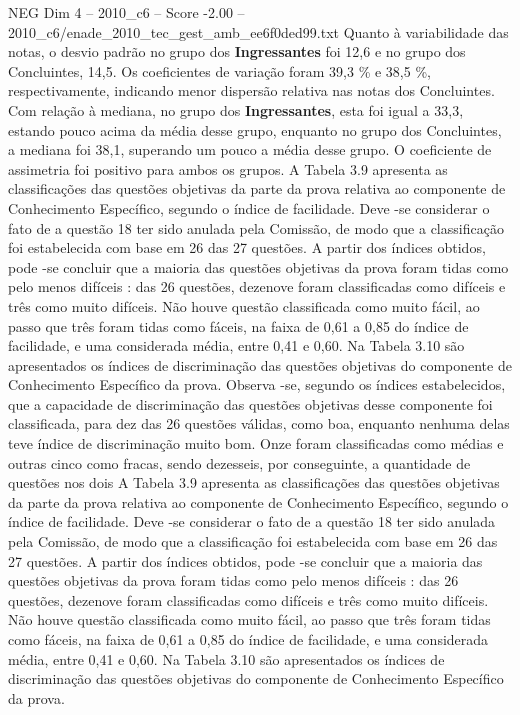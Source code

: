 \begin{textsample}{NEG Dim 4 – 2010\_c6 – Score -2.00 – 2010\_c6/enade\_2010\_tec\_gest\_amb\_ee6f0ded99.txt}
Quanto à variabilidade das notas, o desvio padrão no grupo dos \textbf{Ingressantes} foi 12,6 e no grupo dos Concluintes, 14,5.
Os coeficientes de variação foram 39,3 \% e 38,5 \%, respectivamente, indicando menor dispersão relativa nas notas dos Concluintes.
Com relação à mediana, no grupo dos \textbf{Ingressantes}, esta foi igual a 33,3, estando pouco acima da média desse grupo, enquanto no grupo dos Concluintes, a mediana foi 38,1, superando um pouco a média desse grupo.
O coeficiente de assimetria foi positivo para ambos os grupos.
A Tabela 3.9 apresenta as classificações das questões objetivas da parte da prova relativa ao componente de Conhecimento Específico, segundo o índice de facilidade.
Deve -se considerar o fato de a questão 18 ter sido anulada pela Comissão, de modo que a classificação foi estabelecida com base em 26 das 27 questões.
A partir dos índices obtidos, pode -se concluir que a maioria das questões objetivas da prova foram tidas como pelo menos difíceis : das 26 questões, dezenove foram classificadas como difíceis e três como muito difíceis.
Não houve questão classificada como muito fácil, ao passo que três foram tidas como fáceis, na faixa de 0,61 a 0,85 do índice de facilidade, e uma considerada média, entre 0,41 e 0,60.
Na Tabela 3.10 são apresentados os índices de discriminação das questões objetivas do componente de Conhecimento Específico da prova.
Observa -se, segundo os índices estabelecidos, que a capacidade de discriminação das questões objetivas desse componente foi classificada, para dez das 26 questões válidas, como boa, enquanto nenhuma delas teve índice de discriminação muito bom.
Onze foram classificadas como médias e outras cinco como fracas, sendo dezesseis, por conseguinte, a quantidade de questões nos dois A Tabela 3.9 apresenta as classificações das questões objetivas da parte da prova relativa ao componente de Conhecimento Específico, segundo o índice de facilidade.
Deve -se considerar o fato de a questão 18 ter sido anulada pela Comissão, de modo que a classificação foi estabelecida com base em 26 das 27 questões.
A partir dos índices obtidos, pode -se concluir que a maioria das questões objetivas da prova foram tidas como pelo menos difíceis : das 26 questões, dezenove foram classificadas como difíceis e três como muito difíceis.
Não houve questão classificada como muito fácil, ao passo que três foram tidas como fáceis, na faixa de 0,61 a 0,85 do índice de facilidade, e uma considerada média, entre 0,41 e 0,60.
Na Tabela 3.10 são apresentados os índices de discriminação das questões objetivas do componente de Conhecimento Específico da prova.

\end{textsample}
